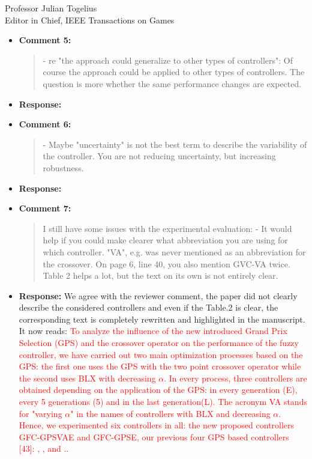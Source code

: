 \documentclass[10pt]{letter} %
\begin{document}
\begin{letter}{Professor Julian Togelius \\ Editor in Chief, IEEE Transactions on Games}
\begin{enumerate}
\begin{itemize}
			\item {\bf Comment 5:}
				\begin{quote}	
					- re "the approach could generalize to other types of controllers": Of course the approach could be applied to other types of controllers. The question is more whether the same performance changes are expected.
				\end{quote}	
			\item {\bf Response:} 
			\item {\bf Comment 6:}
				\begin{quote}	
					- Maybe "uncertainty" is not the best term to describe the variability of the controller. You are not reducing uncertainty, but increasing robustness.
				\end{quote}	
			\item {\bf Response:} 
			\item {\bf Comment 7:}
				\begin{quote}	
					I still have some issues with the experimental evaluation:
					- It would help if you could make clearer what abbreviation you are using for which controller. "VA", e.g. was never mentioned as an abbreviation for the crossover. On page 6, line 40, you also mention GVC-VA twice. Table 2 helps a lot, but the text on its own is not entirely clear.
				\end{quote}	
			\item {\bf Response:} 
			We agree with the reviewer comment, the paper did not clearly describe  the considered controllers and even if the Table.2 is clear, the corresponding text is completely rewritten and highlighted in the manuscript. It now reads:
			\textcolor{red}{
				To analyze the influence of the new introduced Grand Prix Selection (GPS) and the crossover operator on the performance of the fuzzy controller, we have carried out two main optimization processes based on the GPS: the first one uses the GPS with the two point crossover operator while the second uses  BLX with decreasing $\alpha$.
				In every process, three controllers are obtained depending on the application of the GPS: in every generation (E), every 5 generations (5) and in the last generation(L). The acronym VA  stands for "varying $\alpha$" in the names of  controllers with BLX and decreasing $\alpha$.
				Hence, we experimented six controllers in all: the new
				proposed controllers {\sf GFC-GPSVAE} and {\sf GFC-GPSE}, our previous four GPS based controllers  [43]: {}, {},{} and {}..
}
\end{itemize}
\end{enumerate}
\end{letter}
\end{document}
